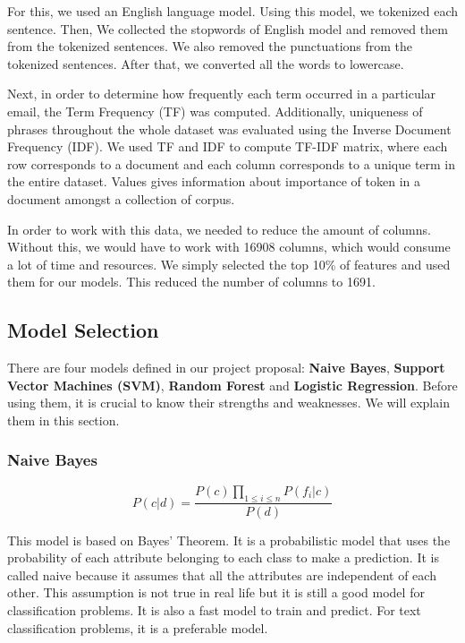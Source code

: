 \documentclass[conference]{IEEEtran}
\begin{document}
For this, we used an English language model. Using this model, we tokenized each sentence. Then, We collected the stopwords of English model and removed them from the tokenized sentences. We also removed the punctuations from the tokenized sentences. After that, we converted all the words to lowercase.

Next, in order to determine how frequently each term occurred in a particular email, the Term Frequency (TF) was computed. Additionally, uniqueness of phrases throughout the whole dataset was evaluated using the Inverse Document Frequency (IDF). We used TF and IDF to compute TF-IDF matrix, where each row corresponds to a document and each column corresponds to a unique term in the entire dataset. Values gives information about importance of token in a document amongst a collection of corpus.

In order to work with this data, we needed to reduce the amount of columns. Without this, we would have to work with 16908 columns, which would consume a lot of time and resources. We simply selected the top 10\% of features and used them for our models. This reduced the number of columns to 1691.

\subsection{Model Selection}

There are four models defined in our project proposal: \textbf{Naive Bayes}, \textbf{Support Vector Machines (SVM)}, \textbf{Random Forest} and \textbf{Logistic Regression}. Before using them, it is crucial to know their strengths and weaknesses. We will explain them in this section.

\subsubsection{Naive Bayes}

\begin{equation*}
    P(c|d) = \frac{P(c) \prod_{1 \leq i \leq n} P(f_i|c)}{P(d)}
\end{equation*}

This model is based on Bayes' Theorem. It is a probabilistic model that uses the probability of each attribute belonging to each class to make a prediction. It is called naive because it assumes that all the attributes are independent of each other. This assumption is not true in real life but it is still a good model for classification problems. It is also a fast model to train and predict. For text classification problems, it is a preferable model.
\end{document}
